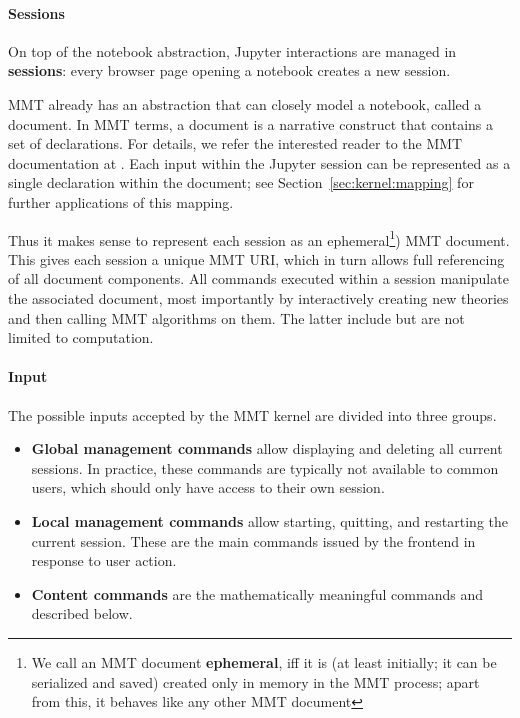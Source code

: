 \paragraph{Sessions}
On top of the notebook abstraction, Jupyter interactions are managed in \textbf{sessions}: every browser page opening a notebook creates a new session.

MMT already has an abstraction that can closely model a notebook, called a document. 
In MMT terms, a document is a narrative construct that contains a set of declarations. 
For details, we refer the interested reader to the MMT documentation at \cite{Rabe:MMT}. 
Each input within the Jupyter session can be represented as a single declaration within the document; see Section~\ref{sec:kernel:mapping} for further applications of this mapping. 

Thus it makes sense to represent each session as an ephemeral\footnote{We call an MMT document \textbf{ephemeral}, iff it is (at least initially; it can be serialized and saved) created only in memory in the MMT process; apart from this, it behaves like any other MMT document}) MMT document. 
This gives each session a unique MMT URI, which in turn allows full referencing of all document components.
All commands executed within a session manipulate the associated document, most importantly by interactively creating new theories and then calling MMT algorithms on them.
The latter include but are not limited to computation.

\paragraph{Input}
The possible inputs accepted by the MMT kernel are divided into three groups.
\begin{itemize}
\item \textbf{Global management commands} allow displaying and deleting all current sessions.
 In practice, these commands are typically not available to common users, which should only have access to their own session.
\item \textbf{Local management commands} allow starting, quitting, and restarting the current session. These are the main commands issued by the frontend in response to user action.
\item \textbf{Content commands} are the mathematically meaningful commands and described below.
\end{itemize}


